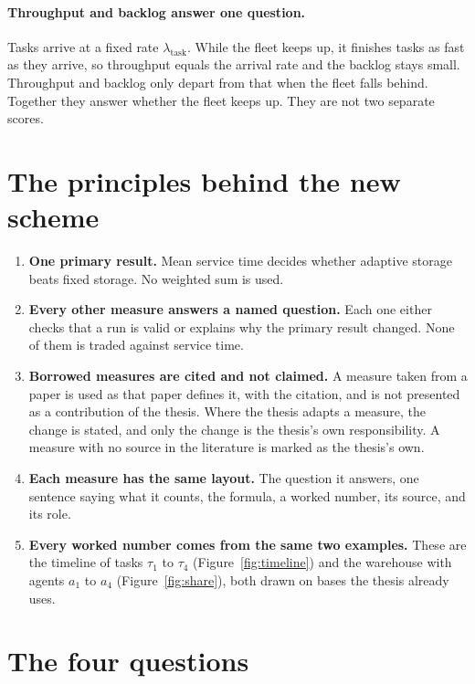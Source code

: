 \documentclass[11pt,a4paper]{article}
\begin{document}
\paragraph{Throughput and backlog answer one question.} Tasks arrive at a
fixed rate $\lambda_{\mathrm{task}}$. While the fleet keeps up, it finishes
tasks as fast as they arrive, so throughput equals the arrival rate and the
backlog stays small. Throughput and backlog only depart from that when the
fleet falls behind. Together they answer whether the fleet keeps up. They
are not two separate scores.

\section{The principles behind the new scheme}
\label{sec:principles}

\begin{enumerate}[leftmargin=1.5em]
  \item \textbf{One primary result.} Mean service time decides whether
    adaptive storage beats fixed storage. No weighted sum is used.
  \item \textbf{Every other measure answers a named question.} Each one
    either checks that a run is valid or explains why the primary result
    changed. None of them is traded against service time.
  \item \textbf{Borrowed measures are cited and not claimed.} A measure
    taken from a paper is used as that paper defines it, with the
    citation, and is not presented as a contribution of the thesis. Where
    the thesis adapts a measure, the change is stated, and only the change
    is the thesis's own responsibility. A measure with no source in the
    literature is marked as the thesis's own.
  \item \textbf{Each measure has the same layout.} The question it
    answers, one sentence saying what it counts, the formula, a worked
    number, its source, and its role.
  \item \textbf{Every worked number comes from the same two examples.}
    These are the timeline of tasks $\tau_1$ to $\tau_4$
    (Figure~\ref{fig:timeline}) and the warehouse with agents $a_1$ to
    $a_4$ (Figure~\ref{fig:share}), both drawn on bases the thesis already
    uses.
\end{enumerate}

\section{The four questions}
\label{sec:questions}
\end{document}
